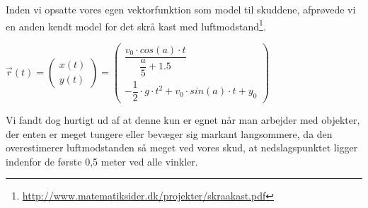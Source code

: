 Inden vi opsatte vores egen vektorfunktion som model til skuddene, afprøvede vi en anden kendt model for det skrå kast med luftmodstand\footnote{\url{ http://www.matematiksider.dk/projekter/skraakast.pdf}}.\\

\begin{center}
\begin{math}
\overrightarrow{r}(t) = 
\begin{pmatrix}
x(t)\\
y(t)
\end{pmatrix}
=
\begin{pmatrix}
\dfrac{v_{0} \cdot cos(a) \cdot t}{\dfrac{a}{5} + 1.5}\\
- \dfrac{1}{2} \cdot g \cdot t^{2} + v_{0} \cdot sin(a) \cdot t + y_{0}
\end{pmatrix}
\end{math}
\end{center}

Vi fandt dog hurtigt ud af at denne kun er egnet når man arbejder med objekter, der enten er meget tungere eller bevæger sig markant langsommere, da den overestimerer luftmodstanden så meget ved vores skud, at nedslagspunktet ligger indenfor de første 0,5 meter ved alle vinkler.

















